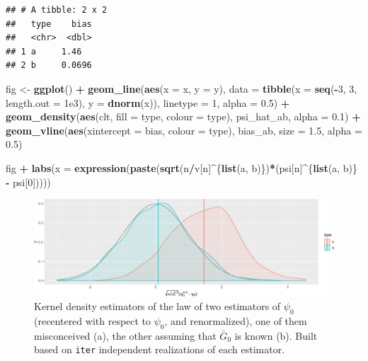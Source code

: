 \documentclass[]{article}
\newenvironment{Shaded}{\begin{snugshade}}{\end{snugshade}}
\newcommand{\DataTypeTok}[1]{\textcolor[rgb]{0.13,0.29,0.53}{#1}}
\newcommand{\DecValTok}[1]{\textcolor[rgb]{0.00,0.00,0.81}{#1}}
\newcommand{\FloatTok}[1]{\textcolor[rgb]{0.00,0.00,0.81}{#1}}
\newcommand{\KeywordTok}[1]{\textcolor[rgb]{0.13,0.29,0.53}{\textbf{#1}}}
\newcommand{\NormalTok}[1]{#1}
\newcommand{\OperatorTok}[1]{\textcolor[rgb]{0.81,0.36,0.00}{\textbf{#1}}}
\newcommand{\StringTok}[1]{\textcolor[rgb]{0.31,0.60,0.02}{#1}}
\newcommand{\Gbar}{\bar{G}}
\theoremstyle{definition}
\theoremstyle{definition}
\theoremstyle{definition}
\theoremstyle{remark}
\begin{document}
\begin{verbatim}
## # A tibble: 2 x 2
##   type    bias
##   <chr>  <dbl>
## 1 a     1.46  
## 2 b     0.0696
\end{verbatim}

\begin{Shaded}
\begin{Highlighting}[]
\NormalTok{fig <-}\StringTok{ }\KeywordTok{ggplot}\NormalTok{() }\OperatorTok{+}
\StringTok{  }\KeywordTok{geom_line}\NormalTok{(}\KeywordTok{aes}\NormalTok{(}\DataTypeTok{x =}\NormalTok{ x, }\DataTypeTok{y =}\NormalTok{ y), }
            \DataTypeTok{data =} \KeywordTok{tibble}\NormalTok{(}\DataTypeTok{x =} \KeywordTok{seq}\NormalTok{(}\OperatorTok{-}\DecValTok{3}\NormalTok{, }\DecValTok{3}\NormalTok{, }\DataTypeTok{length.out =} \FloatTok{1e3}\NormalTok{),}
                          \DataTypeTok{y =} \KeywordTok{dnorm}\NormalTok{(x)),}
            \DataTypeTok{linetype =} \DecValTok{1}\NormalTok{, }\DataTypeTok{alpha =} \FloatTok{0.5}\NormalTok{) }\OperatorTok{+}
\StringTok{  }\KeywordTok{geom_density}\NormalTok{(}\KeywordTok{aes}\NormalTok{(clt, }\DataTypeTok{fill =}\NormalTok{ type, }\DataTypeTok{colour =}\NormalTok{ type),}
\NormalTok{               psi_hat_ab, }\DataTypeTok{alpha =} \FloatTok{0.1}\NormalTok{) }\OperatorTok{+}
\StringTok{  }\KeywordTok{geom_vline}\NormalTok{(}\KeywordTok{aes}\NormalTok{(}\DataTypeTok{xintercept =}\NormalTok{ bias, }\DataTypeTok{colour =}\NormalTok{ type),}
\NormalTok{             bias_ab, }\DataTypeTok{size =} \FloatTok{1.5}\NormalTok{, }\DataTypeTok{alpha =} \FloatTok{0.5}\NormalTok{)}
  
\NormalTok{fig }\OperatorTok{+}
\StringTok{  }\KeywordTok{labs}\NormalTok{(}\DataTypeTok{x =} \KeywordTok{expression}\NormalTok{(}\KeywordTok{paste}\NormalTok{(}\KeywordTok{sqrt}\NormalTok{(n}\OperatorTok{/}\NormalTok{v[n]}\OperatorTok{^}\NormalTok{\{}\KeywordTok{list}\NormalTok{(a, b)\})}\OperatorTok{*}\NormalTok{(psi[n]}\OperatorTok{^}\NormalTok{\{}\KeywordTok{list}\NormalTok{(a, b)\} }\OperatorTok{-}\StringTok{ }\NormalTok{psi[}\DecValTok{0}\NormalTok{]))))}
\end{Highlighting}
\end{Shaded}

\begin{figure}
\centering
\includegraphics{img/known-Gbar-one-b-1.pdf}
\caption{\label{fig:known-Gbar-one-b}Kernel density estimators of the law of
two estimators of \(\psi_{0}\) (recentered with respect to \(\psi_{0}\),
and renormalized), one of them misconceived (a), the other assuming that
\(\Gbar_{0}\) is known (b). Built based on \texttt{iter} independent
realizations of each estimator.}
\end{figure}
\end{document}
